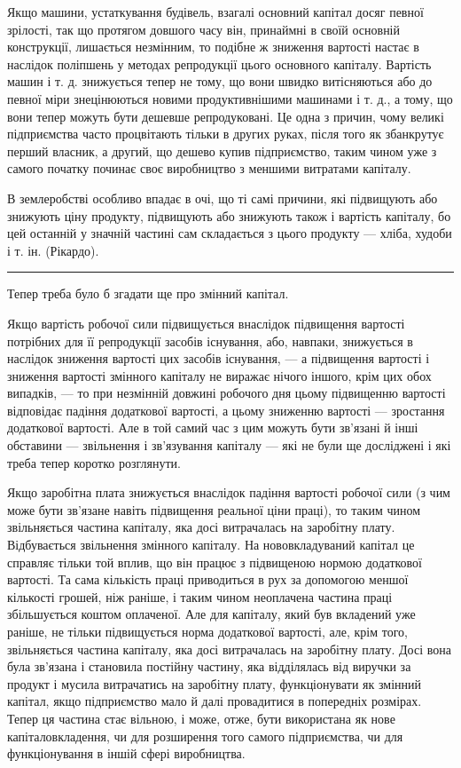 Якщо машини, устаткування будівель, взагалі основний капітал досяг певної зрілості, так що протягом
довшого часу
він, принаймні в своїй основній конструкції, лишається незмінним, то подібне ж зниження вартості
настає в наслідок поліпшень
у методах репродукції цього основного капіталу. Вартість
машин і т. д. знижується тепер не тому, що вони швидко
витісняються або до певної міри знецінюються новими продуктивнішими
машинами і т. д., а тому, що вони тепер можуть
бути дешевше репродуковані. Це одна з причин, чому великі підприємства
часто процвітають тільки в других руках, після того
як збанкрутує перший власник, а другий, що дешево купив
підприємство, таким чином уже з самого початку починає своє
виробництво з меншими витратами капіталу.

В землеробстві особливо впадає в очі, що ті самі причини,
які підвищують або знижують ціну продукту, підвищують або
знижують також і вартість капіталу, бо цей останній у значній
частині сам складається з цього продукту — хліба, худоби і т. ін.
(Рікардо).

\pfbreak

Тепер треба було б згадати ще про змінний капітал.

Якщо вартість робочої сили підвищується внаслідок підвищення
вартості потрібних для її репродукції засобів існування,
або, навпаки, знижується в наслідок зниження вартості цих засобів
існування, — а підвищення вартості і зниження вартості
змінного капіталу не виражає нічого іншого, крім цих обох випадків, — то при незмінній довжині
робочого дня цьому підвищенню вартості відповідає падіння додаткової вартості, а цьому
зниженню вартості — зростання додаткової вартості. Але в той
самий час з цим можуть бути зв’язані й інші обставини — звільнення і зв’язування капіталу — які не
були ще досліджені і які
треба тепер коротко розглянути.

Якщо заробітна плата знижується внаслідок падіння вартості робочої сили (з чим може бути зв’язане
навіть підвищення
реальної ціни праці), то таким чином звільняється частина капіталу, яка досі витрачалась на
заробітну плату. Відбувається
звільнення змінного капіталу. На нововкладуваний капітал це
справляє тільки той вплив, що він працює з підвищеною нормою додаткової вартості. Та сама кількість
праці приводиться
в рух за допомогою меншої кількості грошей, ніж раніше, і таким чином неоплачена частина праці
збільшується коштом
оплаченої. Але для капіталу, який був вкладений уже раніше,
не тільки підвищується норма додаткової вартості, але, крім
того, звільняється частина капіталу, яка досі витрачалась на
заробітну плату. Досі вона була зв’язана і становила постійну
частину, яка відділялась від виручки за продукт і мусила витрачатись на заробітну плату,
функціонувати як змінний капітал,
якщо підприємство мало й далі провадитися в попередніх розмірах. Тепер ця частина стає вільною, і
може, отже, бути використана як нове капіталовкладення, чи для розширення того самого підприємства,
чи для функціонування в іншій сфері
виробництва.

